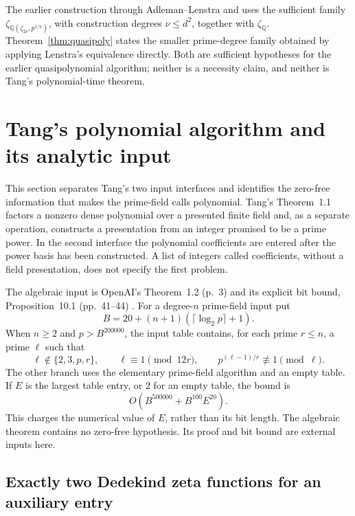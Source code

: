 \documentclass[11pt]{article}
\newcommand{\Q}{\mathbb Q}
\theoremstyle{definition}
\theoremstyle{remark}
\begin{document}
The earlier construction through Adleman--Lenstra and
\citet[Theorem~2, author p.~3]{BGL2001} uses the sufficient
family $\zeta_{\Q(\zeta_{2\nu},p^{1/\nu})}$, with
construction degrees $\nu\leq d^2$, together with
$\zeta_{\Q}$.  Theorem~\ref{thm:quasipoly} states
the smaller prime-degree family obtained by applying
Lenstra's equivalence directly.  Both are sufficient
hypotheses for the earlier quasipolynomial algorithm;
neither is a necessity claim, and neither is Tang's
polynomial-time theorem.


\section{Tang's polynomial algorithm and its analytic input}
\label{sec:tang}

This section separates Tang's two input interfaces and identifies the
zero-free information that makes the prime-field calls polynomial.
Tang's Theorem~1.1 \cite[pp.~1--2]{Tang2026} factors a nonzero dense
polynomial over a presented finite field and, as a separate operation,
constructs a presentation from an integer promised to be a prime power.
In the second interface the polynomial coefficients are entered after
the power basis has been constructed. A list of integers called
coefficients, without a field presentation, does not specify the first
problem.

The algebraic input is OpenAI's Theorem~1.2 (p.~3) and its explicit bit
bound, Proposition~10.1 (pp.~41--44) \cite{OpenAI2026}. For a degree-$n$ prime-field input put
\[
 B=20+(n+1)(\lceil\log_2p\rceil+1).
\]
When $n\geq2$ and $p>B^{200000}$, the input table contains, for each
prime $r\leq n$, a prime $\ell$ such that
\begin{equation}\label{eq:tangaux}
 \ell\notin\{2,3,p,r\},\qquad
 \ell\equiv1\pmod{12r},\qquad
 p^{(\ell-1)/r}\not\equiv1\pmod\ell.
\end{equation}
The other branch uses the elementary prime-field algorithm and an
empty table. If $E$ is the largest table entry, or $2$ for an empty
table, the bound is
\begin{equation}\label{eq:tangbit}
 O(B^{500000}+B^{100}E^{20}).
\end{equation}
This charges the numerical value of $E$, rather than its bit length.
The algebraic theorem contains no zero-free hypothesis. Its proof and
bit bound are external inputs here.

\subsection{Exactly two Dedekind zeta functions for an auxiliary entry}
\end{document}
